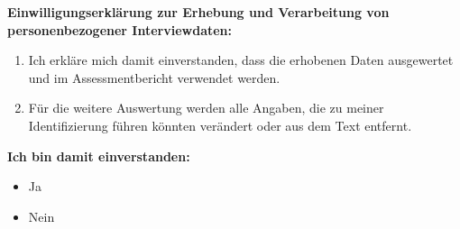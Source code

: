 \documentclass{article}
\begin{document}
\vspace{1cm}

\textbf{Einwilligungserklärung zur Erhebung und Verarbeitung von personenbezogener Interviewdaten:}

\begin{enumerate}
\item Ich erkläre mich damit einverstanden, dass die erhobenen Daten ausgewertet und im Assessmentbericht verwendet werden.   
\item Für die weitere Auswertung werden alle Angaben, die zu meiner Identifizierung führen könnten verändert oder aus dem Text entfernt.
\end{enumerate}

\textbf{Ich bin damit einverstanden:}

\begin{itemize}[label={\Square}] 
\item Ja
\item Nein
\end{itemize} 
\bigskip
\end{document}
